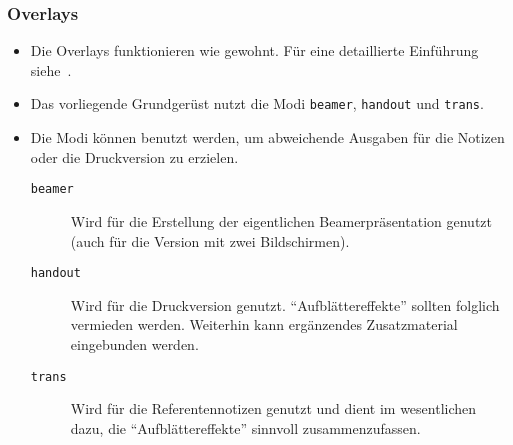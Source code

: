 \begin{frame}
\frametitle{Overlays}

\begin{itemize}
\item Die Overlays funktionieren wie gewohnt. Für eine detaillierte Einführung siehe~\cite{beamerguide}.
\bigskip
\item Das vorliegende Grundgerüst nutzt die Modi \texttt{beamer}, \texttt{handout} und \texttt{trans}.
\item Die Modi können benutzt werden, um abweichende Ausgaben für die Notizen oder die Druckversion zu erzielen.
  \begin{description}
  \item[\texttt{beamer}]  Wird für die Erstellung der eigentlichen Beamerpräsentation
                          genutzt (auch für die Version mit zwei Bildschirmen).
  \item[\texttt{handout}] Wird für die Druckversion genutzt. "`Aufblättereffekte"'
                          sollten folglich vermieden werden. Weiterhin kann ergänzendes
			  Zusatzmaterial eingebunden werden.
  \item[\texttt{trans}]   Wird für die Referentennotizen genutzt und dient im
                          wesentlichen dazu, die "`Aufblättereffekte"' sinnvoll
			  zusammenzufassen.
  \end{description}
\end{itemize}
\end{frame}
